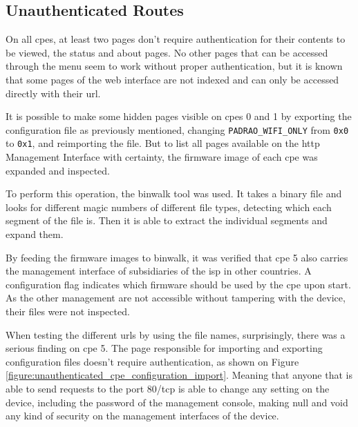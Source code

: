 \subsection{Unauthenticated Routes}

On all \gls{cpe}s, at least two pages don’t require authentication for their contents to be viewed, the status and about pages. No other pages that can be accessed through the menu seem to work without proper authentication, but it is known that some pages of the web interface are not indexed and can only be accessed directly with their \gls{url}.

It is possible to make some hidden pages visible on \glspl{cpe} 0 and 1 by exporting the configuration file as previously mentioned, changing \texttt{PADRAO\_WIFI\_ONLY} from \texttt{0x0} to \texttt{0x1}, and reimporting the file. But to list all pages available on the \gls{http} Management Interface with certainty, the firmware image of each \gls{cpe} was expanded and inspected. 

To perform this operation, the binwalk tool was used. It takes a binary file and looks for different magic numbers of different file types, detecting which each segment of the file is. Then it is able to extract the individual segments and expand them.

By feeding the firmware images to binwalk, it was verified that \gls{cpe} 5 also carries the management interface of subsidiaries of the \gls{isp} in other countries. A configuration flag indicates which firmware should be used by the \gls{cpe} upon start. As the other management are not accessible without tampering with the device, their files were not inspected.

When testing the different \glspl{url} by using the file names, surprisingly, there was a serious finding on \gls{cpe} 5. The page responsible for importing and exporting configuration files doesn’t require authentication, as shown on Figure \ref{figure:unauthenticated_cpe_configuration_import}. Meaning that anyone that is able to send requests to the port 80/tcp is able to change any setting on the device, including the password of the management console, making null and void any kind of security on the management interfaces of the device.


